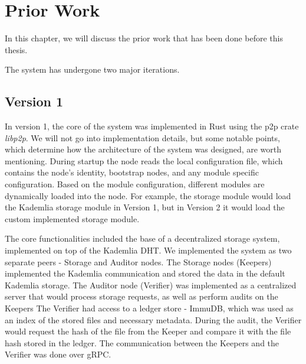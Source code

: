 \label{chapter:prior-work}
\chapter{Prior Work}

In this chapter, we will discuss the prior work that has been done before this thesis.

The system has undergone two major iterations.

\section{Version 1}

In version 1, the core of the system was implemented in Rust using the
p2p crate \textit{libp2p}.
We will not go into implementation details, but some notable points, which determine how the architecture
of the system was designed, are worth mentioning.
During startup the node reads the local configuration file, which contains the node's identity,
bootstrap nodes, and any module specific configuration.
Based on the module configuration, different modules are dynamically loaded into the node.
For example, the storage module would load the Kademlia storage module in Version 1,
but in Version 2 it would load the custom implemented storage module.

The core functionalities included the base of a decentralized storage system,
implemented on top of the Kademlia DHT.
We implemented the system as two separate peers - Storage and Auditor nodes.
The Storage nodes (Keepers) implemented the Kademlia communication and stored the data in the
default Kademlia storage.
The Auditor node (Verifier) was implemented as a centralized server that would process storage requests,
as well as perform audits on the Keepers
The Verifier had access to a ledger store - ImmuDB,
which was used as an index of the stored files and necessary metadata.
During the audit, the Verifier would request the hash of the file from the Keeper
and compare it with the file hash stored in the ledger.
The communication between the Keepers and the Verifier was done over gRPC.

